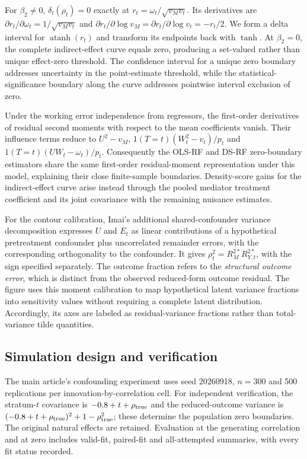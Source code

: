 For $\beta_2\ne0$, $\delta_t(\rho_t)=0$ exactly at $r_t=\omega_t/\sqrt{v_Mv_t}$. Its derivatives are $\partial r_t/\partial\omega_t=1/\sqrt{v_Mv_t}$ and $\partial r_t/\partial\log v_M=\partial r_t/\partial\log v_t=-r_t/2$. We form a delta interval for $\operatorname{atanh}(r_t)$ and transform its endpoints back with $\tanh$. At $\beta_2=0$, the complete indirect-effect curve equals zero, producing a set-valued rather than unique effect-zero threshold. The confidence interval for a unique zero boundary addresses uncertainty in the point-estimate threshold, while the statistical-significance boundary along the curve addresses pointwise interval exclusion of zero.

Under the working error independence from regressors, the first-order derivatives of residual second moments with respect to the mean coefficients vanish. Their influence terms reduce to $U^2-v_M$, $1(T=t)(W_t^2-v_t)/p_t$ and $1(T=t)(UW_t-\omega_t)/p_t$. Consequently the OLS-RF and DS-RF zero-boundary estimators share the same first-order residual-moment representation under this model, explaining their close finite-sample boundaries. Density-score gains for the indirect-effect curve arise instead through the pooled mediator treatment coefficient and its joint covariance with the remaining nuisance estimates.

For the contour calibration, Imai's additional shared-confounder variance decomposition expresses $U$ and $E_t$ as linear contributions of a hypothetical pretreatment confounder plus uncorrelated remainder errors, with the corresponding orthogonality to the confounder. It gives $\rho_t^2=R_M^{2*}R_{Y,t}^{2*}$, with the sign specified separately. The outcome fraction refers to the \emph{structural outcome error}, which is distinct from the observed reduced-form outcome residual. The figure uses this moment calibration to map hypothetical latent variance fractions into sensitivity values without requiring a complete latent distribution. Accordingly, its axes are labeled as residual-variance fractions rather than total-variance tilde quantities.

\subsection{Simulation design and verification}

The main article's confounding experiment uses seed 20260918, $n=300$ and 500 replications per innovation-by-correlation cell. For independent verification, the stratum-$t$ covariance is $-0.8+t+\rho_{\rm true}$ and the reduced-outcome variance is $(-0.8+t+\rho_{\rm true})^2+1-\rho_{\rm true}^2$; these determine the population zero boundaries. The original natural effects are retained. Evaluation at the generating correlation and at zero includes valid-fit, paired-fit and all-attempted summaries, with every fit status recorded.

